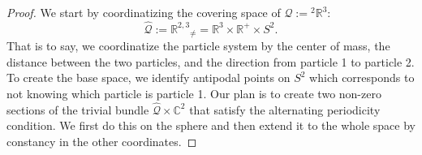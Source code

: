\documentclass[11pt]{article}
\theoremstyle{remark}
\begin{document}
\begin{proof}
We start by coordinatizing the covering space of $\ensuremath{\mathcal{Q}}
\ensuremath{:=}{}^2\mathbb{R}^3 $: 
\[
 \ensuremath{\widehat{\ensuremath{\mathcal{Q}}}} \ensuremath{:=} \ensuremath{\mathbb{R}^{2,3}}_{\neq} = \ensuremath{\mathbb{R}^{3}} \times \ensuremath{\mathbb{R}^{+}} \times S^2.
\]
 That is to say, we coordinatize the particle system  by the
center of mass, the distance between the two particles, and the
direction from particle 1 to particle 2. To create the base space, we
identify antipodal points on $S^2$ which corresponds to not knowing which
particle is particle 1. Our plan is to create two non-zero sections of the
trivial bundle  $\ensuremath{\widehat{\ensuremath{\mathcal{Q}}}} \times \ensuremath{\mathbb{C}}^2$ that satisfy
the alternating periodicity condition. We first do this 
on the sphere and then extend it to the whole space by
constancy in the other coordinates. 


\end{proof}
\end{document}
